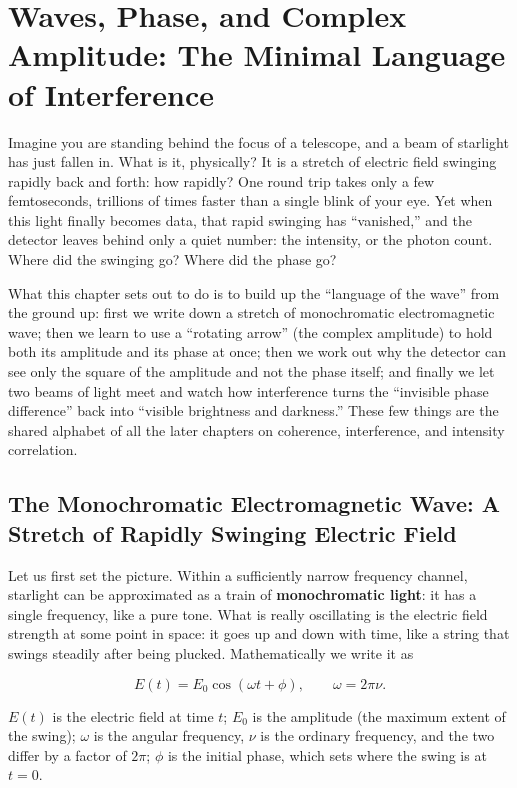 \chapter{Waves, Phase, and Complex Amplitude: The Minimal Language of Interference}
\label{chap:e01}

\begin{chapteropening}
Imagine you are standing behind the focus of a telescope, and a beam of starlight has just fallen in. What is it, physically? It is a stretch of electric field swinging rapidly back and forth: how rapidly? One round trip takes only a few femtoseconds, trillions of times faster than a single blink of your eye. Yet when this light finally becomes data, that rapid swinging has ``vanished,'' and the detector leaves behind only a quiet number: the intensity, or the photon count. Where did the swinging go? Where did the phase go?

What this chapter sets out to do is to build up the ``language of the wave'' from the ground up: first we write down a stretch of monochromatic electromagnetic wave; then we learn to use a ``rotating arrow'' (the complex amplitude) to hold both its amplitude and its phase at once; then we work out why the detector can see only the square of the amplitude and not the phase itself; and finally we let two beams of light meet and watch how interference turns the ``invisible phase difference'' back into ``visible brightness and darkness.'' These few things are the shared alphabet of all the later chapters on coherence, interference, and intensity correlation.
\end{chapteropening}

\section{The Monochromatic Electromagnetic Wave: A Stretch of Rapidly Swinging Electric Field}
\label{sec:e01-wave}

Let us first set the picture. Within a sufficiently narrow frequency channel, starlight can be approximated as a train of \textbf{monochromatic light}: it has a single frequency, like a pure tone. What is really oscillating is the electric field strength at some point in space: it goes up and down with time, like a string that swings steadily after being plucked. Mathematically we write it as

\begin{equation}
  E(t)=E_0\cos(\omega t+\phi),\qquad \omega=2\pi\nu .
  \label{eq:e01-monochromatic}
\end{equation}
\begin{formulaexplain}
\(E(t)\) is the electric field at time \(t\); \(E_0\) is the amplitude (the maximum extent of the swing); \(\omega\) is the angular frequency, \(\nu\) is the ordinary frequency, and the two differ by a factor of \(2\pi\); \(\phi\) is the initial phase, which sets where the swing is at \(t=0\).
\end{formulaexplain}


